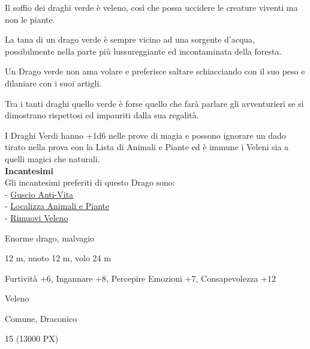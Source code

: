 \begin{multicols}{2}
{Il soffio dei draghi verde è veleno, così che possa uccidere le creature viventi ma non le piante.

La tana di un drago verde è sempre vicino ad una sorgente d'acqua, possibilmente nella parte più lussureggiante ed incontaminata della foresta.

Un Drago verde non ama volare e preferisce saltare schiacciando con il suo peso e dilaniare con i suoi artigli.

Tra i tanti draghi quello verde è forse quello che farà parlare gli avventurieri se si dimostrano rispettosi ed impauriti dalla sua regalità.

I Draghi Verdi hanno +1d6 nelle prove di magia e possono ignorare un dado tirato nella prova con la Lista di Animali e Piante ed è immune i Veleni sia a quelli magici che naturali.\\
\textbf{Incantesimi}\\
Gli incantesimi preferiti di questo Drago sono:\\
- \hyperlink{Guscio Anti-Vita}{Guscio Anti-Vita}\\
- \hyperlink{Localizza Animali e Piante}{Localizza Animali e Piante}\\
- \hyperlink{Rimuovi Veleno}{Rimuovi Veleno}

\begin{description}[noitemsep, topsep=0pt, parsep=0pt, partopsep=0pt, itemsep=1pt, leftmargin=2.35cm,  labelwidth=2.2cm, itemindent=0cm, listparindent=0pt] %
\setlength{\baselineskip}{10pt}
\item[\textbf{Taglia/Tipo}] Enorme drago, malvagio
\item[\textbf{Caratt.}] 
\item[\textbf{Punti Ferita}] 
\item[\textbf{Movimento}] 12 m, nuoto 12 m, volo 24 m
\item[\textbf{Tiri Salvez.}] 
\item[\textbf{Comp.}] Furtività +6, Ingannare +8, Percepire Emozioni +7, Consapevolezza +12
\item[\textbf{Imm. Danni}] Veleno
\item[\textbf{Sensi}] 
\item[\textbf{Linguaggi}] Comune, Draconico
\item[\textbf{Sfida}] 15 (13000 PX)
\end{description}
\smallskip

}
\end{multicols}
